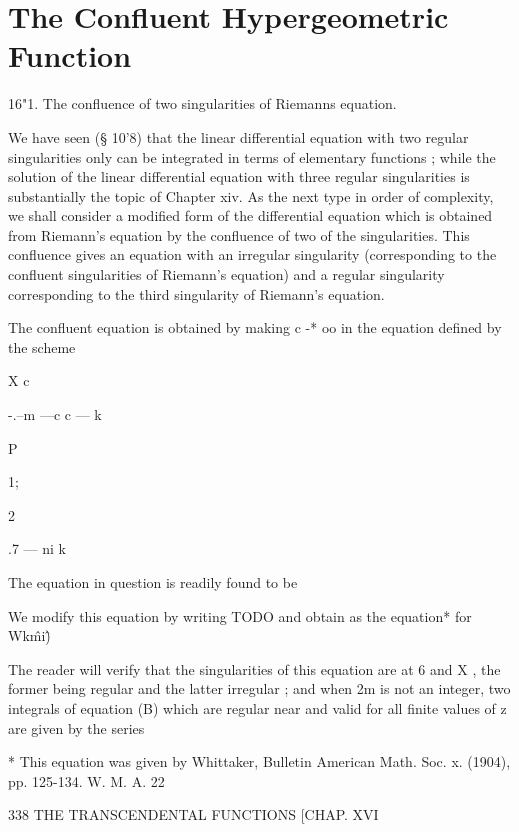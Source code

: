 \chapter{The Confluent Hypergeometric Function}

16"1. The confluence of two singularities of Riemanns equation. 

We have seen (§ 10'8) that the linear differential equation with two 
regular singularities only can be integrated in terms of elementary functions ; 
while the solution of the linear differential equation with three regular 
singularities is substantially the topic of Chapter xiv. As the next type 
in order of complexity, we shall consider a modified form of the differential 
equation which is obtained from Riemann's equation by the confluence of 
two of the singularities. This confluence gives an equation with an irregular 
singularity (corresponding to the confluent singularities of Riemann's equation) 
and a regular singularity corresponding to the third singularity of Riemann's 
equation. 

The confluent equation is obtained by making c -* oo in the equation 
defined by the scheme 

X c  

-.--m —c c — k 



P 



1; 



2 

.7 — ni k 



The equation in question is readily found to be 

We modify this equation by writing 
TODO
and obtain as the 
equation* for Wk\^mi\^) 



The reader will verify that the singularities of this equation are at 
6 and X , the former being regular and the latter irregular ; and when 2m 
is not an integer, two integrals of equation (B) which are regular near and 
valid for all finite values of z are given by the series 



* This equation was given by Whittaker, Bulletin American Math. Soc. x. (1904), pp. 125-134. 
W. M. A. 22 



338 THE TRANSCENDENTAL FUNCTIONS [CHAP. XVI 



